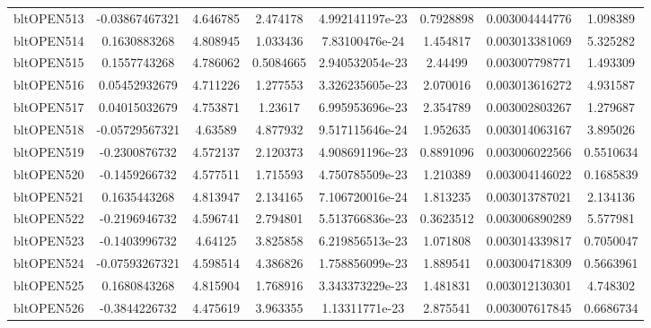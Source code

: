 \documentclass[11pt]{report}
\begin{document}
\begin{sidewaystable}
{\begin{tabular}{|l|c|c|c|c|c|c|c|}
    bltOPEN513   & -0.03867467321   &      4.646785   &      2.474178   & 4.992141197e-23   &     0.7928898   & 0.003004444776   &      1.098389\\
    bltOPEN514   &  0.1630883268   &      4.808945   &      1.033436   & 7.83100476e-24   &      1.454817   & 0.003013381069   &      5.325282\\
    bltOPEN515   &  0.1557743268   &      4.786062   &     0.5084665   & 2.940532054e-23   &       2.44499   & 0.003007798771   &      1.493309\\
    bltOPEN516   & 0.05452932679   &      4.711226   &      1.277553   & 3.326235605e-23   &      2.070016   & 0.003013616272   &      4.931587\\
    bltOPEN517   & 0.04015032679   &      4.753871   &       1.23617   & 6.995953696e-23   &      2.354789   & 0.003002803267   &      1.279687\\
    bltOPEN518   & -0.05729567321   &       4.63589   &      4.877932   & 9.517115646e-24   &      1.952635   & 0.003014063167   &      3.895026\\
    bltOPEN519   & -0.2300876732   &      4.572137   &      2.120373   & 4.908691196e-23   &     0.8891096   & 0.003006022566   &     0.5510634\\
    bltOPEN520   & -0.1459266732   &      4.577511   &      1.715593   & 4.750785509e-23   &      1.210389   & 0.003004146022   &     0.1685839\\
    bltOPEN521   &  0.1635443268   &      4.813947   &      2.134165   & 7.106720016e-24   &      1.813235   & 0.003013787021   &      2.134136\\
    bltOPEN522   & -0.2196946732   &      4.596741   &      2.794801   & 5.513766836e-23   &     0.3623512   & 0.003006890289   &      5.577981\\
    bltOPEN523   & -0.1403996732   &       4.64125   &      3.825858   & 6.219856513e-23   &      1.071808   & 0.003014339817   &     0.7050047\\
    bltOPEN524   & -0.07593267321   &      4.598514   &      4.386826   & 1.758856099e-23   &      1.889541   & 0.003004718309   &     0.5663961\\
    bltOPEN525   &  0.1680843268   &      4.815904   &      1.768916   & 3.343373229e-23   &      1.481831   & 0.003012130301   &      4.748302\\
    bltOPEN526   & -0.3844226732   &      4.475619   &      3.963355   & 1.13311771e-23   &      2.875541   & 0.003007617845   &     0.6686734\\

\end{tabular}}
\end{sidewaystable}
\end{document}
